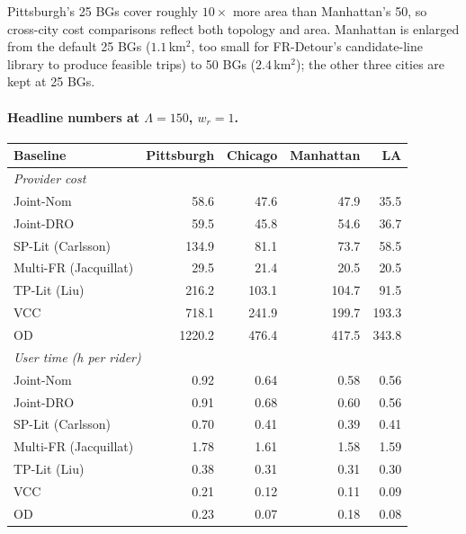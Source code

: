 Pittsburgh's 25 BGs cover roughly $10{\times}$ more area than Manhattan's 50, so cross-city cost comparisons reflect both topology and area. Manhattan is enlarged from the default 25 BGs ($1.1$\,km$^2$, too small for FR-Detour's candidate-line library to produce feasible trips) to 50 BGs ($2.4$\,km$^2$); the other three cities are kept at 25 BGs.

\paragraph{Headline numbers at $\Lambda{=}150$, $w_r{=}1$.}
\begin{center}
\small
\begin{tabular}{lrrrr}
\toprule
Baseline & Pittsburgh & Chicago & Manhattan & LA \\
\midrule
\multicolumn{5}{l}{\emph{Provider cost}} \\
Joint-Nom              &   58.6 &   47.6 &   47.9 &   35.5 \\
Joint-DRO              &   59.5 &   45.8 &   54.6 &   36.7 \\
SP-Lit (Carlsson)      &  134.9 &   81.1 &   73.7 &   58.5 \\
Multi-FR (Jacquillat)  &   29.5 &   21.4 &   20.5 &   20.5 \\
TP-Lit (Liu)           &  216.2 &  103.1 &  104.7 &   91.5 \\
VCC                    &  718.1 &  241.9 &  199.7 &  193.3 \\
OD                     & 1220.2 &  476.4 &  417.5 &  343.8 \\
\midrule
\multicolumn{5}{l}{\emph{User time (h per rider)}} \\
Joint-Nom              & 0.92 & 0.64 & 0.58 & 0.56 \\
Joint-DRO              & 0.91 & 0.68 & 0.60 & 0.56 \\
SP-Lit (Carlsson)      & 0.70 & 0.41 & 0.39 & 0.41 \\
Multi-FR (Jacquillat)  & 1.78 & 1.61 & 1.58 & 1.59 \\
TP-Lit (Liu)           & 0.38 & 0.31 & 0.31 & 0.30 \\
VCC                    & 0.21 & 0.12 & 0.11 & 0.09 \\
OD                     & 0.23 & 0.07 & 0.18 & 0.08 \\
\bottomrule
\end{tabular}
\end{center}

